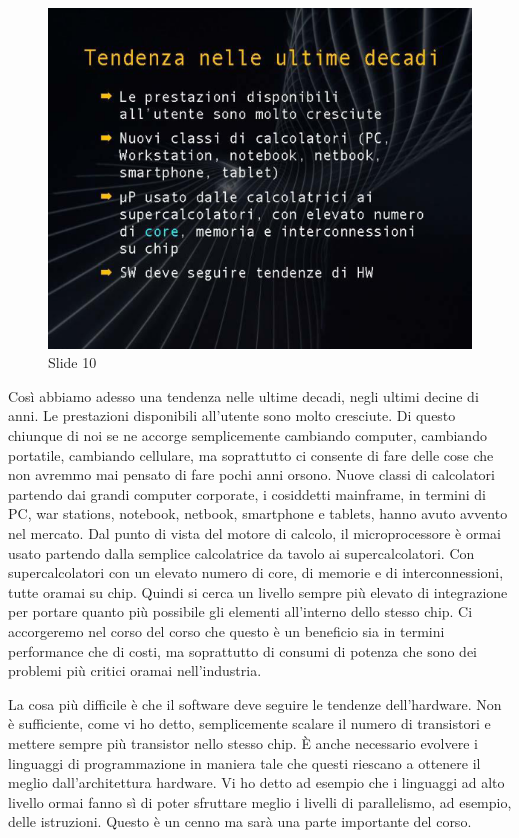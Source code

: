 \begin{figure}[ht]
    \centering
    \includegraphics[width=0.6\linewidth]{images/Lez01_p02_fig_04.png}
    \caption{Slide 10}
    \label{fig:slide_10}
\end{figure}


Così abbiamo adesso una tendenza nelle ultime decadi, negli ultimi decine di anni.
Le prestazioni disponibili all'utente sono molto cresciute.
Di questo chiunque di noi se ne accorge semplicemente cambiando computer, cambiando portatile, cambiando cellulare, ma soprattutto ci consente di fare delle cose che non avremmo mai pensato di fare pochi anni orsono.
Nuove classi di calcolatori partendo dai grandi computer corporate, i cosiddetti mainframe, in termini di PC, war stations, notebook, netbook, smartphone e tablets, hanno avuto avvento nel mercato.
Dal punto di vista del motore di calcolo, il microprocessore è ormai usato partendo dalla semplice calcolatrice da tavolo ai supercalcolatori.
Con supercalcolatori con un elevato numero di core, di memorie e di interconnessioni, tutte oramai su chip.
Quindi si cerca un livello sempre più elevato di integrazione per portare quanto più possibile gli elementi all'interno dello stesso chip.
Ci accorgeremo nel corso del corso che questo è un beneficio sia in termini performance che di costi, ma soprattutto di consumi di potenza che sono dei problemi più critici oramai nell'industria.

La cosa più difficile è che il software deve seguire le tendenze dell'hardware.
Non è sufficiente, come vi ho detto, semplicemente scalare il numero di transistori e mettere sempre più transistor nello stesso chip.
È anche necessario evolvere i linguaggi di programmazione in maniera tale che questi riescano a ottenere il meglio dall'architettura hardware.
Vi ho detto ad esempio che i linguaggi ad alto livello ormai fanno sì di poter sfruttare meglio i livelli di parallelismo, ad esempio, delle istruzioni.
Questo è un cenno ma sarà una parte importante del corso.

